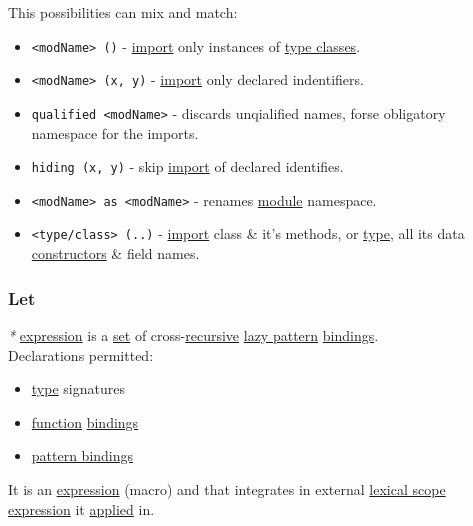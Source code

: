 \documentclass[11pt]{article}
\begin{document}
This possibilities can mix and match:\\
\begin{itemize}
\item \texttt{<modName> ()} - \hyperref[org7d67aa0]{import} only instances of \hyperref[org2efac60]{type classes}.\\
\item \texttt{<modName> (x, y)} - \hyperref[org7d67aa0]{import} only declared indentifiers.\\
\item \texttt{qualified <modName>} - discards unqialified names, forse obligatory namespace for the imports.\\
\item \texttt{hiding (x, y)} - skip \hyperref[org7d67aa0]{import} of declared identifies.\\
\item \texttt{<modName> as <modName>} - renames \hyperref[orgde475c6]{module} namespace.\\
\item \texttt{<type/class> (..)} - \hyperref[org7d67aa0]{import} class \& it's methods, or \hyperref[org4fbaeb8]{type}, all its data \hyperref[orgc5bd814]{constructors} \& field names.\\
\end{itemize}

\subsubsection{\label{org6b52ae3}Let}
\label{sec:orgd8c7cc1}
\emph{*} \hyperref[org667db83]{expression} is a \hyperref[orgbed80ba]{set} of cross-\hyperref[org06bac4d]{recursive} \hyperref[org263341c]{lazy pattern} \hyperref[org5f07c7c]{bindings}.\\

Declarations permitted:\\
\begin{itemize}
\item \hyperref[org4fbaeb8]{type} signatures\\
\item \hyperref[orgeb5cddb]{function} \hyperref[org5f07c7c]{bindings}\\
\item \hyperref[org71f165a]{pattern bindings}\\
\end{itemize}

It is an \hyperref[org667db83]{expression} (macro) and that integrates in external \hyperref[org8fb06f5]{lexical scope} \hyperref[org667db83]{expression} it \hyperref[org848eb1f]{applied} in.\\
\end{document}
